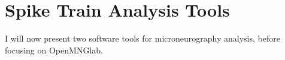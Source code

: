 \section{Spike Train Analysis Tools}
I will now present two software tools for microneurography analysis, before focusing on OpenMNGlab.


